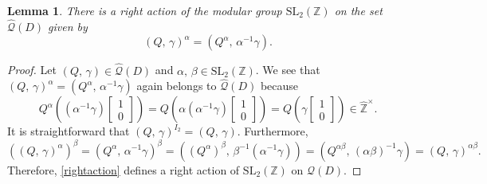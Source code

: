 \documentclass[reqno,11pt]{article}
\theoremstyle{plain} %
\newtheorem{lemma}[theorem]{\indent\sc Lemma}
\theoremstyle{definition} %
\begin{document}
\begin{lemma}\label{action}
There is a right action of the modular group $\mathrm{SL}_2(\mathbb{Z})$ on 
the set $\widehat{\mathcal{Q}}(D)$ given by
\begin{equation}\label{rightaction}
(Q,\,\gamma)^\alpha=(Q^\alpha,\,\alpha^{-1}\gamma). 
\end{equation}
\end{lemma}
\begin{proof}
Let $(Q,\,\gamma)\in\widehat{\mathcal{Q}}(D)$ and $\alpha,\,\beta\in\mathrm{SL}_2(\mathbb{Z})$. 
We see that
 $(Q,\,\gamma)^\alpha=(Q^\alpha,\,\alpha^{-1}\gamma)$ again belongs to $\widehat{\mathcal{Q}}(D)$ because 
\begin{equation*}
Q^\alpha\left((\alpha^{-1}\gamma)\begin{bmatrix}1\\0\end{bmatrix}\right)=
Q\left(\alpha(\alpha^{-1}\gamma)\begin{bmatrix}1\\0\end{bmatrix}\right)
=Q\left(\gamma\begin{bmatrix}1\\0\end{bmatrix}\right)\in\widehat{\mathbb{Z}}^\times. 
\end{equation*}
It is straightforward that $(Q,\,\gamma)^{I_2}=(Q,\,\gamma)$. 
Furthermore, 
\begin{equation*}
((Q,\,\gamma)^\alpha)^\beta=(Q^\alpha,\,\alpha^{-1}\gamma)^\beta=
((Q^\alpha)^\beta,\,\beta^{-1}(\alpha^{-1}\gamma))=
(Q^{\alpha\beta},\,(\alpha\beta)^{-1}\gamma)=(Q,\,\gamma)^{\alpha\beta}. 
\end{equation*}
Therefore, \eqref{rightaction} defines a right action of
$\mathrm{SL}_2(\mathbb{Z})$ on $\widehat{\mathcal{Q}}(D)$.
\end{proof}
\end{document}
